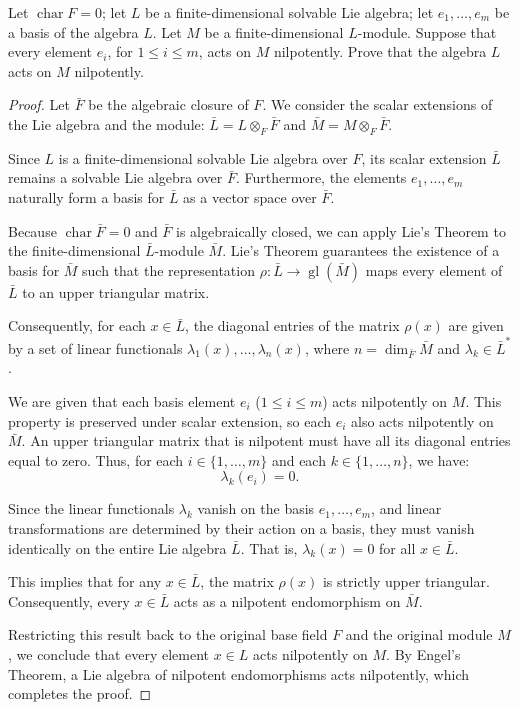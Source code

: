 \begin{exercise}
    Let $\operatorname{char} F = 0$; let $L$ be a finite-dimensional solvable Lie algebra; let $e_1, \dots, e_m$ be a basis of the algebra $L$. Let $M$ be a finite-dimensional $L$-module. Suppose that every element $e_i$, for $1 \le i \le m$, acts on $M$ nilpotently. Prove that the algebra $L$ acts on $M$ nilpotently.
\end{exercise}

\begin{proof}
    Let $\bar{F}$ be the algebraic closure of $F$. We consider the scalar extensions of the Lie algebra and the module: $\bar{L} = L \otimes_F \bar{F}$ and $\bar{M} = M \otimes_F \bar{F}$.

    Since $L$ is a finite-dimensional solvable Lie algebra over $F$, its scalar extension $\bar{L}$ remains a solvable Lie algebra over $\bar{F}$. Furthermore, the elements $e_1, \dots, e_m$ naturally form a basis for $\bar{L}$ as a vector space over $\bar{F}$.

    Because $\operatorname{char} \bar{F} = 0$ and $\bar{F}$ is algebraically closed, we can apply Lie's Theorem to the finite-dimensional $\bar{L}$-module $\bar{M}$. Lie's Theorem guarantees the existence of a basis for $\bar{M}$ such that the representation $\rho: \bar{L} \to \operatorname{gl}(\bar{M})$ maps every element of $\bar{L}$ to an upper triangular matrix.

    Consequently, for each $x \in \bar{L}$, the diagonal entries of the matrix $\rho(x)$ are given by a set of linear functionals $\lambda_1(x), \dots, \lambda_n(x)$, where $n = \dim_{\bar{F}} \bar{M}$ and $\lambda_k \in \bar{L}^*$.

    We are given that each basis element $e_i$ ($1 \le i \le m$) acts nilpotently on $M$. This property is preserved under scalar extension, so each $e_i$ also acts nilpotently on $\bar{M}$. An upper triangular matrix that is nilpotent must have all its diagonal entries equal to zero. Thus, for each $i \in \{1, \dots, m\}$ and each $k \in \{1, \dots, n\}$, we have:
    \[
        \lambda_k(e_i) = 0.
    \]

    Since the linear functionals $\lambda_k$ vanish on the basis $e_1, \dots, e_m$, and linear transformations are determined by their action on a basis, they must vanish identically on the entire Lie algebra $\bar{L}$. That is, $\lambda_k(x) = 0$ for all $x \in \bar{L}$.

    This implies that for any $x \in \bar{L}$, the matrix $\rho(x)$ is strictly upper triangular. Consequently, every $x \in \bar{L}$ acts as a nilpotent endomorphism on $\bar{M}$.

    Restricting this result back to the original base field $F$ and the original module $M$, we conclude that every element $x \in L$ acts nilpotently on $M$. By Engel's Theorem, a Lie algebra of nilpotent endomorphisms acts nilpotently, which completes the proof.
\end{proof}

